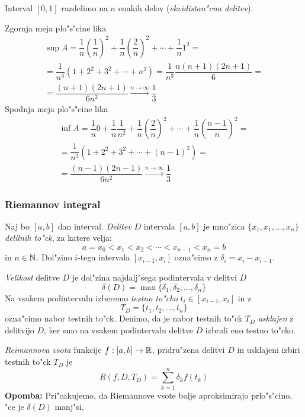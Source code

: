 Interval $[0, 1]$ razdelimo na $n$ enakih delov (\emph{ekvidistan"cna delitev}).

Zgornja meja plo"s"cine lika
\begin{multline*}
\sup A = \dfrac{1}{n} \left(\dfrac{1}{n}\right)^2 + \dfrac{1}{n} \left(\dfrac{2}{n}\right)^2 + \cdots + \dfrac{1}{n} 1^2 = \\
= \dfrac{1}{n^3} (1 + 2^2 + 3^2 + \cdots + n^2) = \dfrac{1}{n^3} \dfrac{n (n+1) (2n + 1)}{6} = \\
= \dfrac{(n + 1) (2n + 1)}{6n^2} \stackrel{n \to \infty}{\longrightarrow} \dfrac{1}{3}
\end{multline*}
Spodnja meja plo"s"cine lika
\begin{multline*}
\inf A = \dfrac{1}{n} 0 + \dfrac{1}{n} \dfrac{1}{n^2} + \dfrac{1}{n} \left(\dfrac{2}{n}\right)^2+ \cdots + \dfrac{1}{n} \left(\dfrac{n-1}{n}\right)^2 = \\
= \dfrac{1}{n^3} (1 + 2^2 + 3^2 + \cdots + (n-1)^2) = \\
= \dfrac{(n - 1) (2n - 1)}{6n^2} \stackrel{n \to \infty}{\longrightarrow} \dfrac{1}{3}
\end{multline*}
%
\subsubsection*{Riemannov integral}
 Naj bo $[a, b]$ dan interval. \emph{Delitev} $D$ intervala $[a, b]$ je mno"zica $\{x_1, x_1, \ldots, x_n\}$ \emph{delilnih to"ck}, za katere velja:
\begin{equation*}
a = x_0 < x_1 < x_2 < \cdots < x_{n-1} < x_n = b
\end{equation*}
in $n \in \mathbb{N}$. Dol"zino $i$-tega intervala $[x_{i-1}, x_i]$ ozna"cimo z $\delta_i = x_i - x_{i-1}$.

\emph{Velikost} delitve $D$ je dol"zina najdalj"sega podintervala v delitvi $D$
\begin{equation*}
\delta(D) = \max \{\delta_1, \delta_2, \ldots, \delta_n\}
\end{equation*}
Na vsakem podintervalu izberemo \emph{testno to"cko} $t_i \in [x_{i-1}, x_i]$ in z
\begin{equation*}
T_D = \{t_1, t_2, \ldots, t_n\}
\end{equation*}
ozna"cimo nabor testnih to"ck. Denimo, da je nabor testnih to"ck $T_D$ \emph{usklajen} z delitvijo $D$, ker smo na vsakem podintervalu delitve $D$ izbrali eno testno to"cko.

\emph{Reimannova vsota} funkcije $f: [a, b] \to \mathbb{R}$, pridru"zena delitvi $D$ in usklajeni izbiri testnih to"ck $T_D$ je
\begin{equation*}
R(f, D, T_D) = \sum_{k=1}^{n} \delta_k f(t_k)
\end{equation*}
\textbf{Opomba:} Pri"cakujemo, da Riemannove vsote bolje aproksimirajo prlo"s"cino, "ce je $\delta(D)$ manj"si.

